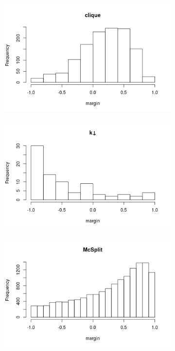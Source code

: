 \documentclass{l4proj}
\theoremstyle{definition}
\theoremstyle{remark}
\begin{document}
\begin{figure}
  \centering
  \begin{subfigure}[t]{0.49\textwidth}
    \centering
    \includegraphics[width=\textwidth]{images/clique_hist.png}
  \end{subfigure}
  \begin{subfigure}[t]{0.49\textwidth}
    \centering
    \includegraphics[width=\textwidth]{images/kdown_hist.png}
  \end{subfigure}
  \begin{subfigure}[t]{0.49\textwidth}
    \centering
    \includegraphics[width=\textwidth]{images/mcsplit_hist.png}

\end{subfigure}
\end{figure}
\end{document}
